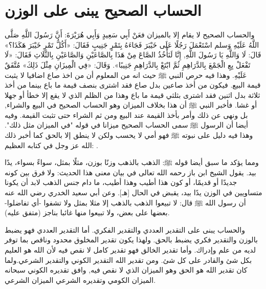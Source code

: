 \section{الحساب الصحيح يبنى على الوزن}

والحساب الصحيح لا يقام إلا بالميزان فعَنْ أَبِي سَعِيدٍ وَأَبِي هُرَيْرَةَ: أَنَّ رَسُولَ اللَّهِ صَلَّى اللَّهُ عَلَيْهِ وَسلم اسْتَعْمَلَ رَجُلًا عَلَى خَيْبَرَ فَجَاءَهُ بِتَمْرٍ جَنِيبٍ فَقَالَ: «أَكُلُّ تَمْرِ خَيْبَرَ هَكَذَا؟» قَالَ: لَا وَاللَّهِ يَا رَسُولَ اللَّهِ, إِنَّا لَنَأْخُذُ الصَّاعَ مِنْ هَذَا بِالصَّاعَيْنِ وَالصَّاعَيْنِ بِالثَّلَاثِ فَقَالَ: «لَا تَفْعَلْ بِعِ الْجَمْعَ بِالدَّرَاهِمِ ثُمَّ ابْتَعْ بِالدَّرَاهِمِ جَنِيبًا». وَقَالَ: «فِي الْمِيزَانِ مِثْلَ ذَلِكَ»
{\footnotesize مُتَّفَقٌ عَلَيْهِ}.
وهذا فيه حرص النبي ﷺ حيث انه من المعلوم أن من اخذ صاع اضافيا لا يثبت قيمة البيع. فيكون من أخذ صاعين بدل صاع فقد اشترى بنصف قيمة ما باع بينما من أخذ ثلاثة بدل اثنين فقد اشترى بثلثي قيمة ما باع وهذا من الظلم الذي لا يقع إلا خطأ أو جهلا أو غشا. فأخبر النبي ﷺ أن هذا بخلاف الميزان وهو الحساب الصحيح في البيع والشراء, بل ونهى عن ذلك وأمر بأخذ القيمة عند البيع ومن ثم الشراء حتى تثبت القيمة. وفيه أيضا أن الرسول ﷺ سمى الحساب الصحيح ميزانا في قوله "في الميزان مثل ذلك". وهذا فيه دليل على نبوته ﷺ فهو أمي لا يحسب ولكن لا ينطق إلا بالحق كما أخبر ذلك الله عز وجل في كتابه العظيم:
\quranayah*[53][3-4]{\footnotesize \surahname*[53]}.

ومما يؤكد ما سبق أيضا قوله ﷺ:
الذهب بالذهب وزنًا بوزن، مثلًا بمثل، سواءً بسواء، يدًا بيد.
يقول الشيخ ابن باز رحمه الله تعالى في بيان معنى هذا الحديث: ولا فرق بين كونه جديدًا أو قديمًا، أو كون هذا أطيب وهذا أطيب، ما دام جنس الذهب لابد أن يكونا متساويين في الوزن يدًا بيد، يقبض في الحال [هـ]. وعن أبي سعيد الخدري رضي الله عنه أن رسول الله ﷺ قال: لا تبيعوا الذهب بالذهب إلا مثلا بمثل ولا تشفوا -أي تفاضلوا- بعضها على بعض، ولا تبيعوا منها غائبا بناجز
{\footnotesize (متفق عليه)}.

والحساب يبنى على التقدير العددي والتقدير الفكري. أما التقدير العددي فهو يضبط بالوزن والتقدير فكري يضبط بالحق. ولهذا يكون تقدير المخلوق محدود وناقص بما توفر لديه من علم وإدراك. وأما تقدير الخالق فهو تقدير كامل لا نقص فيه لأن الله هو العليم بكل شئ والقادر على كل شئ. ومن تقدير الله التقدير الكوني والتقدير الشرعي.ولما كان تقدير الله هو الحق وهو الميزان الذي لا نقص فيه, وافق تقديره الكوني سبحانه الميزان الكومي وتقديره الشرعي الميزان الشرعي.

